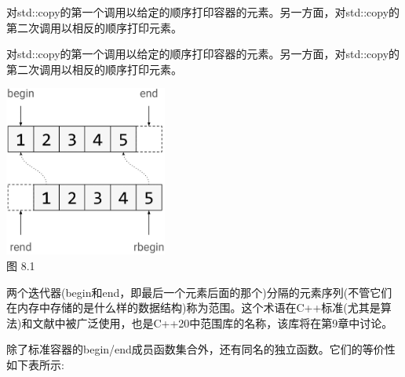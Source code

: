 对std::copy的第一个调用以给定的顺序打印容器的元素。另一方面，对std::copy的第二次调用以相反的顺序打印元素。

对std::copy的第一个调用以给定的顺序打印容器的元素。另一方面，对std::copy的第二次调用以相反的顺序打印元素。

\begin{center}
\includegraphics[width=0.4\textwidth]{content/3/chapter8/images/1.png}\\
图 8.1
\end{center}

两个迭代器(begin和end，即最后一个元素后面的那个)分隔的元素序列(不管它们在内存中存储的是什么样的数据结构)称为范围。这个术语在C++标准(尤其是算法)和文献中被广泛使用，也是C++20中范围库的名称，该库将在第9章中讨论。

除了标准容器的begin/end成员函数集合外，还有同名的独立函数。它们的等价性如下表所示:

